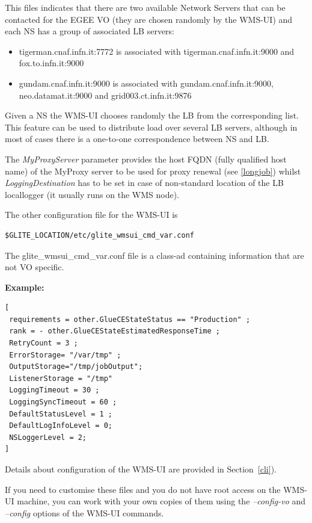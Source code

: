 This files indicates that there are two available Network Servers that can be contacted for the EGEE VO (they
are chosen randomly by the WMS-UI) and each NS has a group of associated LB servers:

\begin{itemize}
   \item tigerman.cnaf.infn.it:7772 is associated with tigerman.cnaf.infn.it:9000 and 
fox.to.infn.it:9000
   \item gundam.cnaf.infn.it:9000 is associated with gundam.cnaf.infn.it:9000, neo.datamat.it:9000 
and grid003.ct.infn.it:9876
\end{itemize}

Given a NS the WMS-UI chooses randomly the LB from the corresponding list. This feature can be used to
distribute load over several LB servers, although in most of cases there is a one-to-one correspondence
between NS and LB.

The \emph{MyProxyServer} parameter provides the host FQDN (fully qualified host name) of the MyProxy server 
to be used for proxy renewal (see \ref{longjob}) whilst \emph{LoggingDestination} has to be set in case of 
non-standard location of the LB locallogger (it usually runs on the WMS node). 

The other configuration file for the WMS-UI is

\smallskip
\begin{verbatim}
$GLITE_LOCATION/etc/glite_wmsui_cmd_var.conf
\end{verbatim}
\smallskip

The glite\_wmsui\_cmd\_var.conf file is a class-ad containing information that are not VO specific. 

\textbf{Example:}
\smallskip
\begin{verbatim}
[ 
 requirements = other.GlueCEStateStatus == "Production" ; 
 rank = - other.GlueCEStateEstimatedResponseTime ; 
 RetryCount = 3 ; 
 ErrorStorage= "/var/tmp" ; 
 OutputStorage="/tmp/jobOutput"; 
 ListenerStorage = "/tmp" 
 LoggingTimeout = 30 ; 
 LoggingSyncTimeout = 60 ;  
 DefaultStatusLevel = 1 ; 
 DefaultLogInfoLevel = 0; 
 NSLoggerLevel = 2; 
] 
\end{verbatim}
\smallskip

Details about configuration of the WMS-UI are provided in Section~\ref{cli}).

If you need to customise these files and you do not have root access on the WMS-UI machine, you can work with your own 
copies of them using the \emph{--config-vo} and \emph{--config} options of the WMS-UI commands.

